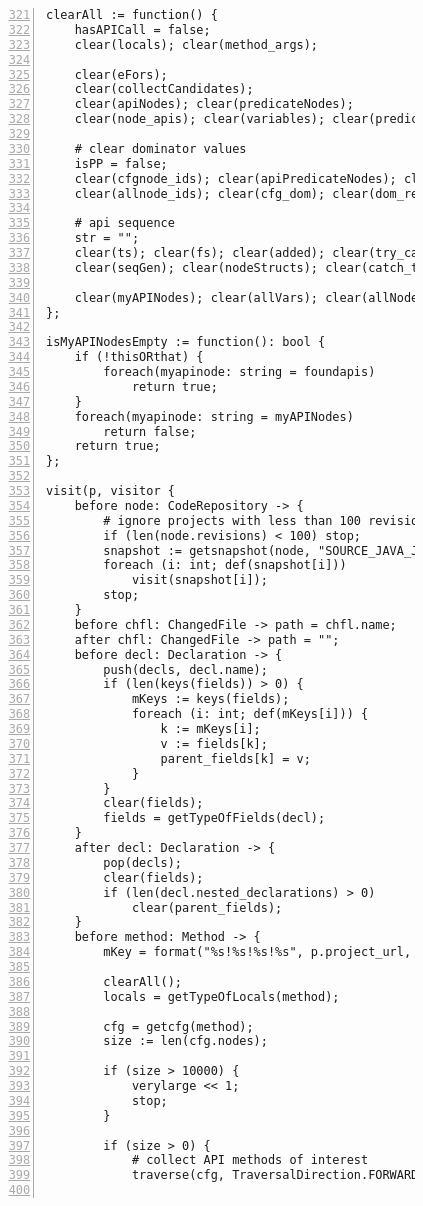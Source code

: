 \begin{figure}[ht!]
\begin{lstlisting}[numbers=left, tabsize=4, escapechar=@, caption={API Usage Mining Analysis},label={lst:aun-code},  firstline = 321, firstnumber = 321, lastline = 381]
clearAll := function() {
    hasAPICall = false;
    clear(locals); clear(method_args);
	    
	clear(eFors);
    clear(collectCandidates);
    clear(apiNodes); clear(predicateNodes); 
    clear(node_apis); clear(variables); clear(predicates);
	    
	# clear dominator values
	isPP = false;
    clear(cfgnode_ids); clear(apiPredicateNodes); clear(exits); clear(exitsT);
    clear(allnode_ids); clear(cfg_dom); clear(dom_result); clear(dom_more); clear(terminals);
	    
    # api sequence
    str = "";
    clear(ts); clear(fs); clear(added); clear(try_catch_finally); clear(catch_counts);
    clear(seqGen); clear(nodeStructs); clear(catch_types);
    
    clear(myAPINodes); clear(allVars); clear(allNodeIds); clear(hops); clear(foundapis);
};

isMyAPINodesEmpty := function(): bool {
    if (!thisORthat) {
        foreach(myapinode: string = foundapis)
            return true;
    }
    foreach(myapinode: string = myAPINodes)    
        return false;
    return true;
};

visit(p, visitor {
	before node: CodeRepository -> {
	    # ignore projects with less than 100 revisions
        if (len(node.revisions) < 100) stop;
		snapshot := getsnapshot(node, "SOURCE_JAVA_JLS");
		foreach (i: int; def(snapshot[i]))
			visit(snapshot[i]);
		stop;
	}
	before chfl: ChangedFile -> path = chfl.name;
	after chfl: ChangedFile -> path = "";
	before decl: Declaration -> {
	    push(decls, decl.name);
	    if (len(keys(fields)) > 0) {
	        mKeys := keys(fields);    
	        foreach (i: int; def(mKeys[i])) {
	        	k := mKeys[i];
	        	v := fields[k];
	            parent_fields[k] = v;
	        }
	    }
	    clear(fields);
	    fields = getTypeOfFields(decl);
	}
    after decl: Declaration -> {
        pop(decls);
        clear(fields);
        if (len(decl.nested_declarations) > 0)
            clear(parent_fields);
    }
	before method: Method -> {
	    mKey = format("%s!%s!%s!%s", p.project_url, path, peek(decls), method.name);
	    
        clearAll();
        locals = getTypeOfLocals(method);

	    cfg = getcfg(method);
	    size := len(cfg.nodes);
	    
	    if (size > 10000) {
		    verylarge << 1;
		    stop;
		}
		
		if (size > 0) {
		    # collect API methods of interest
		    traverse(cfg, TraversalDirection.FORWARD, TraversalKind.SHALLOW_ITERATIVE, collectCandidates);    
            

\end{lstlisting}
\end{figure}
